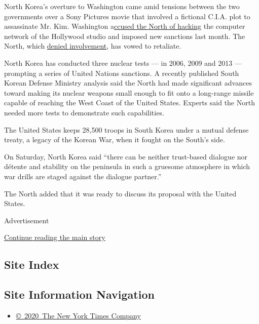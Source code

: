North Korea's overture to Washington came amid tensions between the two
governments over a Sony Pictures movie that involved a fictional C.I.A.
plot to assassinate Mr. Kim. Washington
a\href{http://www.nytimes.com/2014/12/18/world/asia/us-links-north-korea-to-sony-hacking.html}{ccused
the North of hacking} the computer network of the Hollywood studio and
imposed new sanctions last month. The North, which
\href{http://www.nytimes.com/2014/12/08/business/north-korea-denies-hacking-sony-but-calls-attack-a-righteous-deed.html}{denied
involvement}, has vowed to retaliate.

North Korea has conducted three nuclear tests --- in 2006, 2009 and 2013
--- prompting a series of United Nations sanctions. A recently published
South Korean Defense Ministry analysis said the North had made
significant advances toward making its nuclear weapons small enough to
fit onto a long-range missile capable of reaching the West Coast of the
United States. Experts said the North needed more tests to demonstrate
such capabilities.

The United States keeps 28,500 troops in South Korea under a mutual
defense treaty, a legacy of the Korean War, when it fought on the
South's side.

On Saturday, North Korea said ``there can be neither trust-based
dialogue nor détente and stability on the peninsula in such a gruesome
atmosphere in which war drills are staged against the dialogue
partner.''

The North added that it was ready to discuss its proposal with the
United States.

Advertisement

\protect\hyperlink{after-bottom}{Continue reading the main story}

\hypertarget{site-index}{%
\subsection{Site Index}\label{site-index}}

\hypertarget{site-information-navigation}{%
\subsection{Site Information
Navigation}\label{site-information-navigation}}

\begin{itemize}
\tightlist
\item
  \href{https://help.nytimes.com/hc/en-us/articles/115014792127-Copyright-notice}{©~2020~The
  New York Times Company}
\end{itemize}

